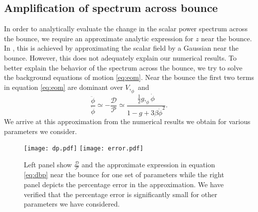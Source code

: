 \documentclass[12pt,a4paper]{article}
\numberwithin{equation}{section}
\numberwithin{equation}{section}
\begin{document}
\subsection{Amplification of spectrum across bounce}
\label{subsec:amps}
In order to analytically evaluate the change in the scalar power spectrum across the bounce, we require an approximate analytic expression for $z$ near the bounce. In \cite{Cai:2012va}, this is achieved by approximating the scalar field by a Gaussian near the bounce. However, this does not adequately explain our numerical results. To better explain the behavior of the spectrum across the bounce, we try to solve the background equations of motion \eqref{eq:eom}. 
Near the bounce the first two terms in equation \eqref{eq:eom} are dominant over $V,_{\phi}$ and 
\begin{equation}
   \frac{\ddot{\phi}}{\dot{\phi}}\simeq - \frac{\mathcal{D}}{\mathcal{P}} \simeq \frac{\frac{1}{2} g,_{\phi} \dot{\phi}}{  {1-g + 3 \beta \dot{\phi}^2  }}. 
    \label{eq:dbp}
\end{equation}
We arrive at this approximation from the numerical results we obtain for various parameters we consider.
\begin{figure}[H]
    \centering
    \texttt{[image: dp.pdf]} 
    \hspace{0.5cm}
     \texttt{[image: error.pdf]} 
     \caption{Left panel show $\frac{\mathcal{D}}{\mathcal{P}}$ and the approximate expression in equation \eqref{eq:dbp} near the bounce for one set of parameters while the right panel depicts the percentage error in the approximation.  We have verified that the percentage error is significantly small for other parameters we have considered. } 
 \label{fig:dp approx}
\end{figure}    
\end{document}
